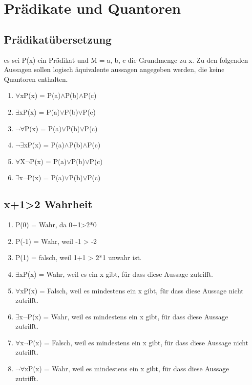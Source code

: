 \section{Prädikate und Quantoren}
\subsection{Prädikatübersetzung}
es sei P(x) ein Prädikat und M = {a, b, c} die Grundmenge zu x. Zu den folgenden
Aussagen sollen logisch äquivalente aussagen angegeben werden, die keine Quantoren
enthalten.
{\renewcommand{\labelenumi}{\alph{enumi}}
\begin{enumerate}
    \item $\forall$xP(x) = P(a)$\wedge$P(b)$\wedge$P(c)
    \item $\exists$xP(x) = P(a)$\vee$P(b)$\vee$P(c)
    \item $\neg\forall$P(x) = P(a)$\vee$P(b)$\vee$P(c)
    \item $\neg\exists$xP(x) = P(a)$\wedge$P(b)$\wedge$P(c)
    \item $\forall$X$\neg$P(x) = P(a)$\vee$P(b)$\vee$P(c)
    \item $\exists$x$\neg$P(x) = P(a)$\vee$P(b)$\vee$P(c)
\end{enumerate}
\subsection{x+1>2 Wahrheit}
\begin{enumerate}
    \item P(0) = Wahr, da 0+1>2*0
    \item P(-1) = Wahr, weil -1 > -2
    \item P(1) = falsch, weil 1+1 > 2*1 unwahr ist.
    \item $\exists$xP(x) = Wahr, weil es ein x gibt, für dass diese Aussage
    zutrifft.
    \item $\forall$xP(x) = Falsch, weil es mindestens ein x gibt, für dass diese Aussage nicht zutrifft.
    \item $\exists$x$\neg$P(x) = Wahr, weil es mindestens ein x gibt, für dass diese Aussage zutrifft.
    \item $\forall$x$\neg$P(x) = Falsch, weil es mindestens ein x gibt, für dass diese Aussage nicht zutrifft.
    \item $\neg\forall$xP(x) = Wahr, weil es mindestens ein x gibt, für dass diese Aussage zutrifft.
\end{enumerate}
}
